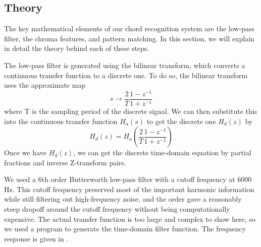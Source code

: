 \documentclass[journal]{IEEEtran}
\begin{document}
\subsection{Theory}
The key mathematical elements of our chord recognition system are the low-pass filter, the chroma features, and pattern matching.
In this section, we will explain in detail the theory behind each of these steps.

The low-pass filter is generated using the bilinear transform, which converts a continuous transfer function to a discrete one.
To do so, the bilinear transform uses the approximate map
\begin{equation}
    s \to \frac{2}{T}\frac{1 - z^{-1}}{1 + z^{-1}}
    \label{eq:s_to_z}
\end{equation}
where T is the sampling period of the discrete signal.
We can then substitute this into the continuous transfer function $H_a(s)$ to get the discrete one $H_d(z)$ by 
\begin{equation}
    H_d(z) = H_a\!\left(\frac{2}{T}\frac{1 - z^{-1}}{1 + z^{-1}}\right)
    \label{eq:bilinear}
\end{equation}
Once we have $H_d(z)$, we can get the discrete time-domain equation by partial fractions and inverse Z-transform pairs.

We used a 6th order Butterworth low-pass filter with a cutoff frequency at 6000 Hz.
This cutoff frequency preserved most of the important harmonic information while still filtering out high-frequency noise, and the order gave a reasonably steep dropoff around the cutoff frequency without being computationally expensive.
The actual transfer function is too large and complex to show here, so we used a program to generate the time-domain filter function.
The frequency response is given in .
\end{document}
